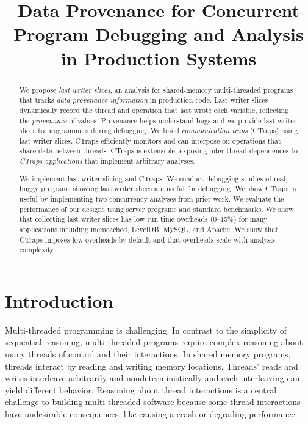 \documentclass[preprint,9pt]{sigplanconf}
\title{Data Provenance for Concurrent Program Debugging and Analysis in Production Systems}
\newcommand{\ctraps}{CTraps\xspace}
\begin{document}
\maketitle

\begin{abstract}
We propose {\em last writer slices}, an analysis for shared-memory
multi-threaded programs that tracks {\em data provenance information} in
production code.  Last writer slices dynamically record the thread and
operation that last wrote each variable, reflecting the {\em provenance} of
values.  Provenance helps understand bugs and we provide last writer slices to
programmers during debugging.  We build {\em communication traps}
(\ctraps) using last writer slices.  \ctraps efficiently
monitors and can interpose on operations that share data between
threads.  \ctraps is extensible, exposing inter-thread dependences
to {\em \ctraps applications} that implement arbitrary analyses.  

We implement last writer slicing and \ctraps.  We conduct debugging studies of
real, buggy programs showing last writer slices are useful for debugging.  We
show \ctraps is useful by implementing two concurrency analyses from prior
work.  We evaluate the performance of our designs using server programs
and standard benchmarks.  We show that collecting last writer slices
has low run time overheads (0--15\%) for many applications,including  
memcached, LevelDB, MySQL, and Apache.  We show that \ctraps imposes low 
overheads by default and that overheads scale with analysis complexity.

\end{abstract}

\section{Introduction}
Multi-threaded programming is challenging.  In contrast to the simplicity of
sequential reasoning, multi-threaded programs require complex reasoning about
many threads of control and their interactions.  In shared memory programs,
threads interact by reading and writing memory locations.  Threads' reads and
writes interleave arbitrarily and nondeterministically and each interleaving
can yield different behavior.  Reasoning about thread interactions is a central
challenge to building multi-threaded software because some thread interactions
have undesirable consequences, like causing a crash or degrading performance.
\end{document}
